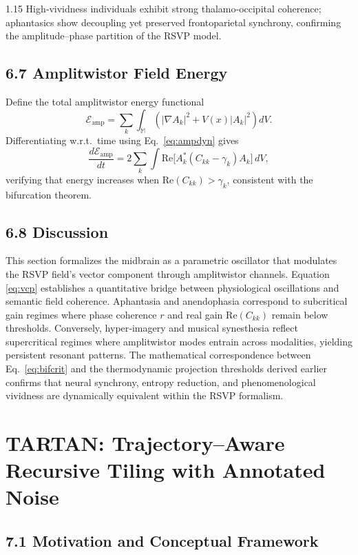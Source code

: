 \documentclass[12pt,a4paper]{article}
\begin{document}
\begin{spacing}{1.15}
High‐vividness individuals exhibit strong thalamo‐occipital coherence; aphantasics show decoupling yet preserved frontoparietal synchrony, confirming the amplitude–phase partition of the RSVP model.

\subsection{6.7 Amplitwistor Field Energy}

Define the total amplitwistor energy functional
\[
\mathcal{E}_{\mathrm{amp}}
 = \sum_k \int_{\mathbb{M}}
   \left( |\nabla A_k|^2 + V(x)|A_k|^2 \right)\!dV.
\]
Differentiating w.r.t.\ time using Eq.~\eqref{eq:ampdyn} gives
\[
\frac{d\mathcal{E}_{\mathrm{amp}}}{dt}
 = 2\sum_k \int \mathrm{Re}\big[A_k^\ast (C_{kk}-\gamma_k)A_k\big]\,dV,
\]
verifying that energy increases when $\mathrm{Re}(C_{kk})>\gamma_k$, consistent with the bifurcation theorem.

\subsection{6.8 Discussion}

This section formalizes the midbrain as a parametric oscillator that modulates the RSVP field’s vector component through amplitwistor channels.  
Equation \eqref{eq:vcp} establishes a quantitative bridge between physiological oscillations and semantic field coherence.  
Aphantasia and anendophasia correspond to subcritical gain regimes where phase coherence $r$ and real gain $\mathrm{Re}(C_{kk})$ remain below thresholds.  
Conversely, hyper‐imagery and musical synesthesia reflect supercritical regimes where amplitwistor modes entrain across modalities, yielding persistent resonant patterns.  
The mathematical correspondence between Eq.~\eqref{eq:bifcrit} and the thermodynamic projection thresholds derived earlier confirms that neural synchrony, entropy reduction, and phenomenological vividness are dynamically equivalent within the RSVP formalism.

\section{TARTAN: Trajectory–Aware Recursive Tiling with Annotated Noise}

\subsection{7.1 Motivation and Conceptual Framework}


\end{spacing}
\end{document}
